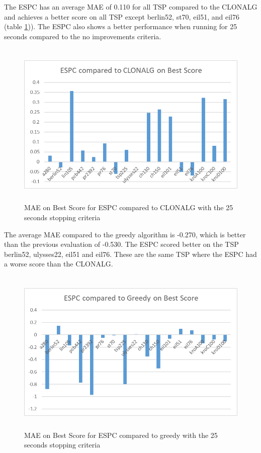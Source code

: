 The ESPC has an average MAE of 0.110 for all TSP compared to the CLONALG and achieves a better score on all TSP except berlin52, st70, eil51, and eil76 (table \ref{ESPC_Time})). The ESPC also shows a better performance when running for 25 seconds compared to the no improvements criteria.
\begin{figure}[H]
	\includegraphics[height=8cm,width=13cm]{Images/ESPC_Time2.png}
	\caption{MAE on Best Score for ESPC compared to CLONALG with the 25 seconds stopping criteria}
	\label{ESPC_Time}
\end{figure}
The average MAE compared to the greedy algorithm is -0.270, which is better than the previous evaluation of -0.530. The ESPC scored better on the TSP berlin52, ulysses22, eil51 and eil76. These are the same TSP where the ESPC had a worse score than the CLONALG.
\begin{figure}[H]
	\includegraphics[height=8cm,width=13cm]{Images/ESPC_Greedy_Time2.png}
	\caption{MAE on Best Score for ESPC compared to greedy with the 25 seconds stopping criteria}
	\label{ESPC_greedy_TIME}
\end{figure}
